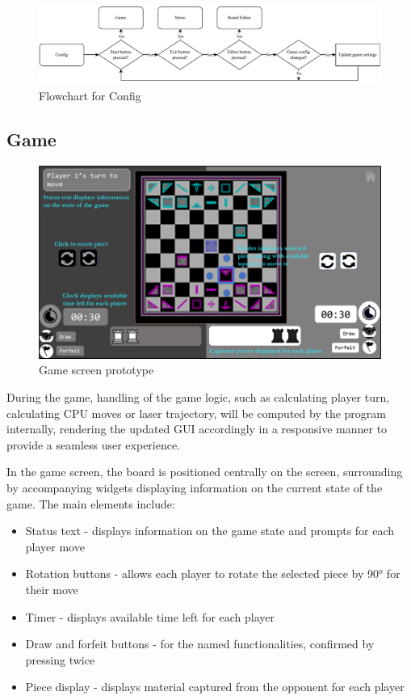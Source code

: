 \documentclass[../main/main.tex]{subfiles}
\begin{document}
\begin{figure}[H]
    \centering
    \includegraphics[width=\columnwidth]{../design/assets/config_flowchart.pdf}
    \caption{Flowchart for Config}
    \label{fig:config-flowchart}
\end{figure}

\subsection{Game}
\begin{figure}[H]
    \centering
    \includegraphics[width=0.8\columnwidth]{../design/assets/game_gui.png}
    \caption{Game screen prototype}
    \label{fig:game-gui}
\end{figure}

During the game, handling of the game logic, such as calculating player turn, calculating CPU moves or laser trajectory, will be computed by the program internally, rendering the updated GUI accordingly in a responsive manner to provide a seamless user experience.

In the game screen, the board is positioned centrally on the screen, surrounding by accompanying widgets displaying information on the current state of the game. The main elements include:

\begin{itemize}
\item Status text - displays information on the game state and prompts for each player move
\item Rotation buttons - allows each player to rotate the selected piece by 90° for their move
\item Timer - displays available time left for each player
\item Draw and forfeit buttons - for the named functionalities, confirmed by pressing twice
\item Piece display - displays material captured from the opponent for each player
\end{itemize}
\end{document}
